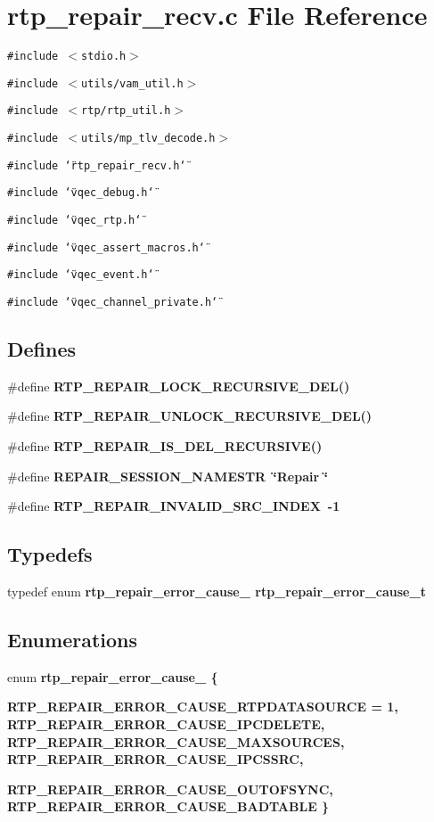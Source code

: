 \section{rtp\_\-repair\_\-recv.c File Reference}
\label{rtp__repair__recv_8c}
{\tt \#include $<$stdio.h$>$}\par
{\tt \#include $<$utils/vam\_\-util.h$>$}\par
{\tt \#include $<$rtp/rtp\_\-util.h$>$}\par
{\tt \#include $<$utils/mp\_\-tlv\_\-decode.h$>$}\par
{\tt \#include \char`\"{}rtp\_\-repair\_\-recv.h\char`\"{}}\par
{\tt \#include \char`\"{}vqec\_\-debug.h\char`\"{}}\par
{\tt \#include \char`\"{}vqec\_\-rtp.h\char`\"{}}\par
{\tt \#include \char`\"{}vqec\_\-assert\_\-macros.h\char`\"{}}\par
{\tt \#include \char`\"{}vqec\_\-event.h\char`\"{}}\par
{\tt \#include \char`\"{}vqec\_\-channel\_\-private.h\char`\"{}}\par
\subsection*{Defines}
\begin{CompactItemize}
\item 
\#define \bf{RTP\_\-REPAIR\_\-LOCK\_\-RECURSIVE\_\-DEL}()
\item 
\#define \bf{RTP\_\-REPAIR\_\-UNLOCK\_\-RECURSIVE\_\-DEL}()
\item 
\#define \bf{RTP\_\-REPAIR\_\-IS\_\-DEL\_\-RECURSIVE}()
\item 
\#define \bf{REPAIR\_\-SESSION\_\-NAMESTR}~\char`\"{}Repair \char`\"{}
\item 
\#define \bf{RTP\_\-REPAIR\_\-INVALID\_\-SRC\_\-INDEX}~-1
\end{CompactItemize}
\subsection*{Typedefs}
\begin{CompactItemize}
\item 
typedef enum \bf{rtp\_\-repair\_\-error\_\-cause\_\-} \bf{rtp\_\-repair\_\-error\_\-cause\_\-t}
\end{CompactItemize}
\subsection*{Enumerations}
\begin{CompactItemize}
\item 
enum \bf{rtp\_\-repair\_\-error\_\-cause\_\-} \{ \par
\bf{RTP\_\-REPAIR\_\-ERROR\_\-CAUSE\_\-RTPDATASOURCE} =  1, 
\bf{RTP\_\-REPAIR\_\-ERROR\_\-CAUSE\_\-IPCDELETE}, 
\bf{RTP\_\-REPAIR\_\-ERROR\_\-CAUSE\_\-MAXSOURCES}, 
\bf{RTP\_\-REPAIR\_\-ERROR\_\-CAUSE\_\-IPCSSRC}, 
\par
\bf{RTP\_\-REPAIR\_\-ERROR\_\-CAUSE\_\-OUTOFSYNC}, 
\bf{RTP\_\-REPAIR\_\-ERROR\_\-CAUSE\_\-BADTABLE}
 \}
\end{CompactItemize}
